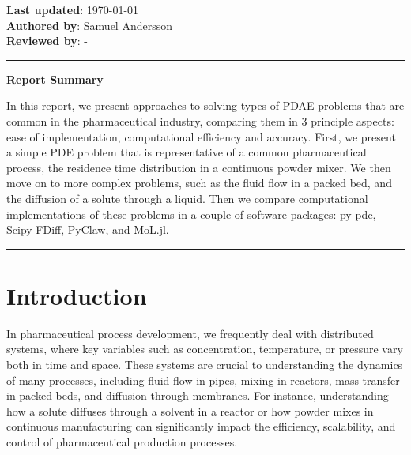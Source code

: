 \documentclass{article}
\begin{document}
\noindent
\textbf{Last updated}: \today\\
\textbf{Authored by}: Samuel Andersson\\
\textbf{Reviewed by}: -\\

\vspace{0.5cm}


\rule{\textwidth}{0.1pt}

\begin{center} \textbf{{\large Report Summary}} \end{center}

In this report, we present approaches to solving types of PDAE problems that are common in the pharmaceutical industry, comparing them in 3 principle aspects: ease of implementation, computational efficiency and accuracy.
First, we present a simple PDE problem that is representative of a common pharmaceutical process, the residence time distribution in a continuous powder mixer. We then move on to more complex problems, such as the fluid flow in a packed bed, and the diffusion of a solute through a liquid.
Then we compare computational implementations of these problems in a couple of software packages: py-pde, Scipy FDiff, PyClaw, and MoL.jl.


\rule{\textwidth}{0.1pt}

\vspace{1cm}

{
    \vspace*{-1.3cm}
    \renewcommand\contentsname{}
    \addcontentsline{}{}{}

    \tableofcontents
}

\newpage{}

\section{Introduction}

In pharmaceutical process development, we frequently deal with distributed systems, where key variables such as concentration, temperature, or pressure vary both in time and space. These systems are crucial to understanding the dynamics of many processes, including fluid flow in pipes, mixing in reactors, mass transfer in packed beds, and diffusion through membranes. For instance, understanding how a solute diffuses through a solvent in a reactor or how powder mixes in continuous manufacturing can significantly impact the efficiency, scalability, and control of pharmaceutical production processes.
\end{document}
